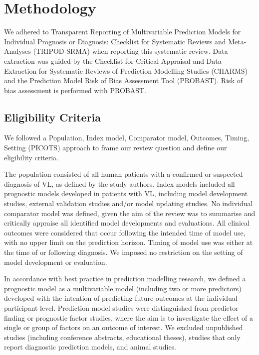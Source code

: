 \section{Methodology}

We adhered to Transparent Reporting of Multivariable Prediction Models for Individual Prognosis or Diagnosis: Checklist for Systematic Reviews and Meta-Analyses (TRIPOD-SRMA) when reporting this systematic review\cite{snellTransparentReportingMultivariable2023}. Data extraction was guided by the Checklist for Critical Appraisal and Data Extraction for Systematic Reviews of Prediction Modelling Studies (CHARMS)\cite{moonsCriticalAppraisalData2014} and the Prediction Model Risk of Bias Assessment Tool (PROBAST)\cite{wolffPROBASTToolAssess2019,moons2019}. Risk of bias assessment is performed with PROBAST\cite{wolffPROBASTToolAssess2019}.

\subsection{Eligibility Criteria}

We followed a Population, Index model, Comparator model, Outcomes, Timing, Setting (PICOTS) approach to frame our review question and define our eligibility criteria\cite{moonsCriticalAppraisalData2014,debray2017}.

The population consisted of all human patients with a confirmed or suspected diagnosis of VL, as defined by the study authors. Index models included all prognostic models developed in patients with VL, including model development studies, external validation studies and/or model updating studies. No individual comparator model was defined, given the aim of the review was to summarise and critically appraise all identified model developments and evaluations. All clinical outcomes were considered that occur following the intended time of model use, with no upper limit on the prediction horizon. Timing of model use was either at the time of or following diagnosis. We imposed no restriction on the setting of model development or evaluation.

In accordance with best practice in prediction modelling research\cite{steyerbergPrognosisResearchStrategy2013,wolffPROBASTToolAssess2019,collins2015}, we defined a prognostic model as a multivariable model (including two or more predictors) developed with the intention of predicting future outcomes at the individual participant level. Prediction model studies were distinguished from predictor finding or prognostic factor studies, where the aim is to investigate the effect of a single or group of factors on an outcome of interest\cite{rileyGuideSystematicReview2019}. We excluded unpublished studies (including conference abstracts, educational theses), studies that only report diagnostic prediction models, and animal studies.

